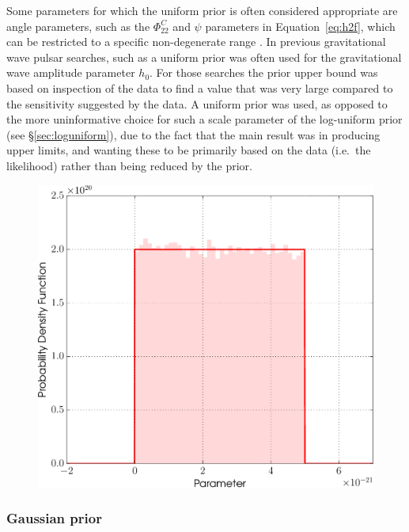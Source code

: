 Some parameters for which the uniform prior is often considered appropriate are angle parameters, such as the $\Phi_{22}^C$ and $\psi$
parameters in Equation~\ref{eq:h2f}, which can be restricted to a specific non-degenerate range \citep[see, e.g., Table~1 in][]{2015MNRAS.453.4399P}. 
In previous gravitational wave pulsar searches, such as \citet{2010ApJ...713..671A,2014ApJ...785..119A} a uniform prior was often used for
the gravitational wave amplitude parameter $h_0$. For those searches the prior upper bound was based on inspection of the data to find a
value that was very large compared to the sensitivity suggested by the data. A uniform prior was used, as opposed to the more
uninformative choice for such a scale parameter of the log-uniform prior (see \S\ref{sec:loguniform}), due to the fact that the main
result was in producing upper limits, and wanting these to be primarily based on the data (i.e.\ the likelihood) rather than being reduced
by the prior.

\begin{figure}[!phtb]
\begin{center}
\includegraphics[width=1\columnwidth]{./figures/priors/uniform/uniform}
\caption{ \protect}
\end{center}
\end{figure}

\subsubsection{Gaussian prior}\label{sec:gaussianprior}

